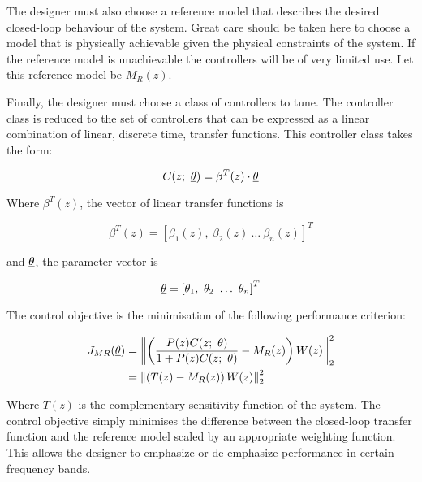 The designer must also choose a reference model that describes the desired closed-loop behaviour of the system. Great care should be taken here to choose a model that is physically achievable given the physical constraints of the system. If the reference model is unachievable the controllers will be of very limited use. Let this reference model be \( M_R(z) \).

Finally, the designer must choose a class of controllers to tune. The controller class is reduced to the set of controllers that can be expressed as a linear combination of linear, discrete time, transfer functions. This controller class takes the form:

\begin{equation}
    C(z;\ \underline{\theta}) = \beta^T(z) \cdot \underline{\theta}
\end{equation}

\noindent
Where \( \beta^T(z) \), the vector of linear transfer functions is

\begin{equation*}
    \beta^T(z) = \left[ \beta_1(z),\ \beta_2(z)\ \ldots\ \beta_n(z) \right]^T
\end{equation*}

\noindent
and \( \underline{\theta} \), the parameter vector is 

\begin{equation*}
    \thetavec = \left[ \theta_1,\ \theta_2\ \ldots\ \theta_n \right]^T
\end{equation*}

The control objective is the minimisation of the following performance criterion:

\begin{equation}
    \begin{aligned}
        J_{MR}(\underline{\theta}) 
            &= \left \Vert \left( \frac{P(z)C(z;\ \theta)}{1 + P(z)C(z;\ \theta)} - M_R(z) \right) W(z) \right \Vert_2^2 \\
            &= \left \Vert \left( T(z) - M_R(z) \right) W(z) \right \Vert_2^2
    \end{aligned} 
    \label{eq:control_obj_mr}   
\end{equation}

\noindent
Where \( T(z) \) is the complementary sensitivity function of the system. The control objective simply minimises the difference between the closed-loop transfer function and the reference model scaled by an appropriate weighting function. This allows the designer to emphasize or de-emphasize performance in certain frequency bands.


